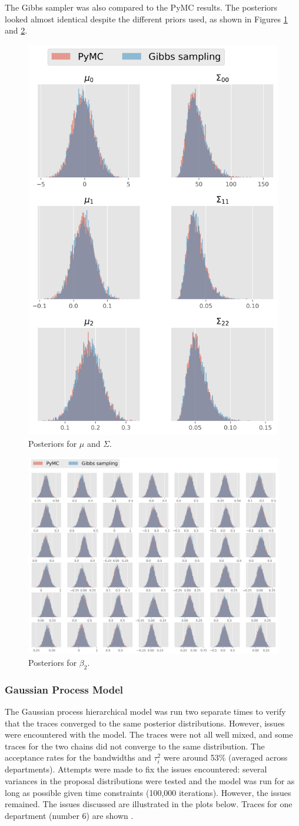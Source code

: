 \documentclass[paper=a4, fontsize=11pt]{scrartcl}
\begin{document}
The Gibbs sampler was also compared to the PyMC results. The posteriors looked almost identical despite the different priors used, as shown in Figures \ref{pymc1} and \ref{pymc2}. 
\begin{figure}[!htb]
\centering
\includegraphics[width=.35\textwidth]{project/writeup/compare_gibbs_pymc1.png}
\caption{Posteriors for $\mu$ and $\Sigma$.}
\label{pymc1}
\end{figure}
\begin{figure}[!htb]
\centering
\includegraphics[width=.85\textwidth]{project/writeup/compare_gibbs_pymc2.png}
\caption{Posteriors for $\beta_2$.}
\label{pymc2}
\end{figure}

\newpage


\subsubsection{Gaussian Process Model}
The Gaussian process hierarchical model was run two separate times to verify that the traces converged to the same posterior distributions. However, issues were encountered with the model. The traces were not all well mixed, and some traces for the two chains did not converge to the same distribution. The acceptance rates for the bandwidths and $\tau^2_i$ were around 53\% (averaged across departments). Attempts were made to fix the issues encountered: several variances in the proposal distributions were tested and the model was run for as long as possible given time constraints (100,000 iterations). However, the issues remained. The issues discussed are illustrated in the plots below.  Traces for one department (number 6) are shown .\\
\end{document}
